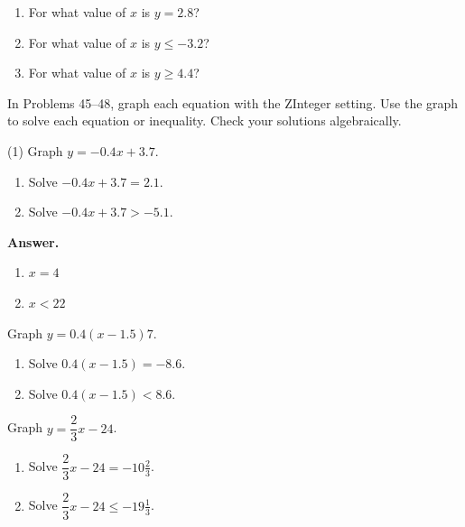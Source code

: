 \documentclass[10pt,]{book}
\theoremstyle{plain}
\theoremstyle{definition}
\theoremstyle{definition}
\theoremstyle{definition}
\theoremstyle{definition}
\numberwithin{equation}{part}
\newcommand{\lt}{<}
\newcommand{\gt}{>}
\begin{document}
\begin{exerciselist}
\begin{exercisegroup}
\begin{enumerate}[label=*\alph**]
\item\hypertarget{li-860}{}For what value of \(x\) is \(y = 2.8\)?%
\item\hypertarget{li-861}{}For what value of \(x\) is \(y\le -3.2 \)?%
\item\hypertarget{li-862}{}For what value of \(x\) is \(y\ge 4.4\)?%
\end{enumerate}
%
\end{exercisegroup}
\par\smallskip\noindent
\hypertarget{exercisegroup-24}{}\par\noindent In Problems 45–48, graph each equation with the ZInteger setting. Use the graph to solve each equation or inequality. Check your solutions algebraically.%
\begin{exercisegroup}(1)
\exercise[45.]\hypertarget{exercise-202}{}Graph \(y = -0.4x + 3.7\). \leavevmode%
\begin{enumerate}[label=*\alph**]
\item\hypertarget{li-863}{}Solve \(-0.4x + 3.7 = 2.1\).%
\item\hypertarget{li-864}{}Solve \(-0.4x + 3.7\gt -5.1\).%
\end{enumerate}
%
\par\smallskip
\noindent\textbf{Answer.}\hypertarget{answer-115}{}\quad
\leavevmode%
\begin{multicols}{2}
\begin{enumerate}[label=*\alph**]
\item\hypertarget{li-865}{}\(x = 4 \)%
\item\hypertarget{li-866}{}\(x\lt 22 \)%
\end{enumerate}
\end{multicols}
%
\exercise[46.]\hypertarget{exercise-203}{}Graph \(y = 0.4 (x - 1.5)7\). \leavevmode%
\begin{enumerate}[label=*\alph**]
\item\hypertarget{li-867}{}Solve \(0.4 (x - 1.5) = -8.6\).%
\item\hypertarget{li-868}{}Solve \(0.4 (x - 1.5)\lt 8.6\).%
\end{enumerate}
%
\exercise[47.]\hypertarget{exercise-204}{}Graph \(y = \dfrac{2}{3}x - 24\). \leavevmode%
\begin{enumerate}[label=*\alph**]
\item\hypertarget{li-869}{}Solve \(\dfrac{2}{3}x - 24 = -10\frac{2}{3} \).%
\item\hypertarget{li-870}{}Solve \(\dfrac{2}{3}x - 24\le -19\frac{1}{3} \).%
\end{enumerate}

\end{exercisegroup}
\end{exerciselist}
\end{document}
